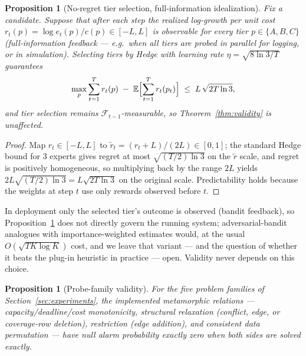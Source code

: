 \documentclass[pdflatex,sn-mathphys-num]{sn-jnl}
\theoremstyle{thmstyleone}
\newtheorem{proposition}[theorem]{Proposition}
\theoremstyle{thmstyletwo}
\newcommand{\Filt}{\mathcal{F}}
\begin{document}
\begin{proposition}[No-regret tier selection, full-information
idealization]\label{prop:regret}
Fix a candidate. Suppose that after each step the realized log-growth
per unit cost $r_t(p) = \log e_t(p)/c(p) \in [-L, L]$ is observable
for \emph{every} tier $p \in \{A, B, C\}$ (full-information feedback
--- e.g.\ when all tiers are probed in parallel for logging, or in
simulation). Selecting tiers by Hedge
\cite{freund1997decision, cesabianchi2006prediction} with learning
rate $\eta = \sqrt{8 \ln 3 / T}$ guarantees
\[
\max_{p}\sum_{t=1}^{T} r_t(p) \;-\;
\mathbb{E}\Bigl[\sum_{t=1}^{T} r_t(p_t)\Bigr]
\;\le\; L\,\sqrt{2T\ln 3},
\]
and tier selection remains $\Filt_{t-1}$-measurable, so
Theorem~\ref{thm:validity} is unaffected.
\end{proposition}

\begin{proof}
Map $r_t \in [-L, L]$ to $\tilde r_t = (r_t + L)/(2L) \in [0,1]$;
the standard Hedge bound for $3$ experts
\cite[Thm.~2.2]{cesabianchi2006prediction} gives regret at most
$\sqrt{(T/2)\ln 3}$ on the $\tilde r$ scale, and regret is
positively homogeneous, so multiplying back by the range $2L$ yields
$2L\sqrt{(T/2)\ln 3} = L\sqrt{2T\ln 3}$ on the original scale.
Predictability holds because the weights at step $t$ use only rewards
observed before $t$.
\end{proof}

In deployment only the selected tier's outcome is observed (bandit
feedback), so Proposition~\ref{prop:regret} does not directly govern
the running system; adversarial-bandit analogues with
importance-weighted estimates would, at the usual
$O(\sqrt{TK \log K})$ cost, and we leave that variant --- and the
question of whether it beats the plug-in heuristic in practice ---
open. Validity never depends on this choice.

\begin{proposition}[Probe-family validity]\label{prop:mr}
For the five problem families of Section~\ref{sec:experiments}, the
implemented metamorphic relations --- capacity/deadline/cost
monotonicity, structural relaxation (conflict, edge, or coverage-row
deletion), restriction (edge addition), and consistent data
permutation --- have null alarm probability exactly zero when both
sides are solved exactly.
\end{proposition}
\end{document}

